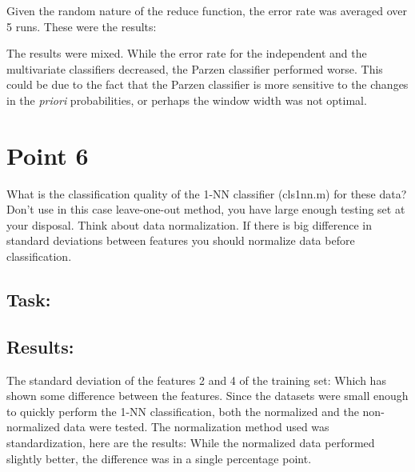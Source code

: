 \documentclass[
  a4paper,            %
  DIV=10,             %
  oneside,            %
  BCOR=5mm,           %
  parskip=half,       %
  numbers=noenddot,   %
  bibtotoc,           %
  listof=totoc        %
]{scrreprt}
\begin{document}
Given the random nature of the reduce function, the error rate was averaged over 5 runs.
These were the results:

The results were mixed.
While the error rate for the independent and the multivariate classifiers decreased, the Parzen classifier performed worse.
This could be due to the fact that the Parzen classifier is more sensitive to the changes in the \textit{priori} probabilities, or perhaps the window width was not optimal.
\section*{Point 6}
What is the classification quality of the 1-NN classifier (cls1nn.m) for these data?
\\
Don't use in this case leave-one-out method, you have large enough testing set at your disposal.
Think about data normalization.
If there is big difference in standard deviations between features you should normalize data before classification.
\subsection*{Task:}
\subsection*{Results:}
The standard deviation of the features 2 and 4 of the training set:
Which has shown some difference between the features.
Since the datasets were small enough to quickly perform the 1-NN classification, both the normalized and the non-normalized data were tested.
The normalization method used was standardization, here are the results:
While the normalized data performed slightly better, the difference was in a single percentage point.
\end{document}
